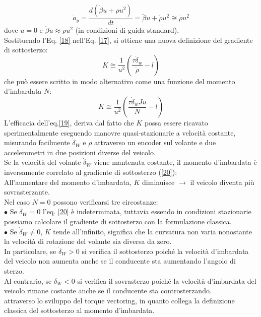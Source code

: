 \begin{equation} \label{18}
    \dot{a}_y = \frac{d(\dot{\beta}u + \rho u^2)}{dt} = \ddot{\beta}u + \dot{\rho}u^2 \cong \dot{\rho}u^2
\end{equation}
dove $\dot{u} = 0$   e  $\ddot{\beta}u \approx \dot{\rho}u^2$ (in condizioni di guida standard).\\ 
Sostituendo l'Eq. \ref{18} nell'Eq. \ref{17}, si ottiene una nuova definizione del gradiente di sottosterzo:
\begin{equation} \label{19}
    K \cong \frac{1}{u^2} \left( \frac{\tau \dot{\delta}_w }{\dot{\rho}} - l \right)    
\end{equation}
che può essere scritto in modo alternativo come una funzione del momento d'imbardata $N$:
\begin{equation} \label{20}
    K \cong \frac{1}{u^2} \left( \frac{\tau \dot{\delta}_wJu}{N} - l \right)
\end{equation}
L'efficacia dell'eq.\ref{19}, deriva dal fatto che $K$ possa essere ricavato sperimentalmente eseguendo manovre quasi-stazionarie a velocità costante, misurando facilmente $\dot{\delta}_W$ e $\dot{\rho}$ attraverso un encoder sul volante e due accelerometri in due posizioni diverse del veicolo. \\
Se la velocità del volante $\dot{\delta}_W$ viene mantenuta costante, il momento d'imbardata è inversamente correlato al gradiente di sottosterzo (\ref{20}):\\ 
All'aumentare del momento d'imbardata, $K$ diminuisce $\xrightarrow{}$ il veicolo diventa più sovrasterzante.\\
Nel caso $N = 0$ possono verificarsi tre circostanze:\\ 
$\bullet$ Se $\dot{\delta}_W = 0$ l'eq. \ref{20} è indeterminata, tuttavia essendo in condizioni stazionarie possiamo calcolare il gradiente di sottosterzo con la formulazione classica.\\
$\bullet$ Se $\dot{\delta}_W \neq 0$, $K$ tende all'infinito, significa che la curvatura non varia nonostante la velocità di rotazione del volante sia diversa da zero.\\
In particolare,
se $\dot{\delta}_W > 0$ si verifica il sottosterzo poiché la velocità d'imbardata del veicolo non aumenta anche se il conducente sta aumentando l'angolo di sterzo.\\ 
Al contrario, se $\dot{\delta}_W < 0$ si verifica il sovrasterzo poiché la velocità d'imbardata del veicolo rimane costante anche se il conducente sta controsterzando.\\
attraverso lo sviluppo del torque vectoring, 
in quanto collega la definizione classica del sottosterzo al momento d'imbardata.
